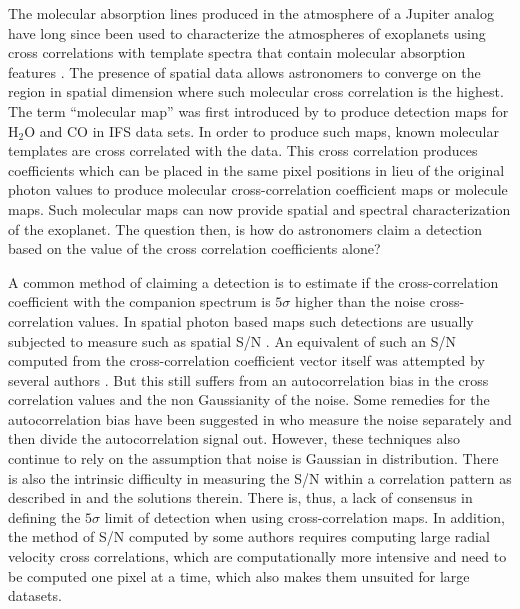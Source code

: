 \documentclass{aa}
\begin{document}
The molecular absorption lines produced in the atmosphere of a Jupiter analog have long since been used to characterize the atmospheres of exoplanets using cross correlations with template spectra \cite[e.g][]{birkby2013detection,snellen2010orbital} that contain molecular absorption features \citep[e.g][]{2003BTsettl}.
The presence of spatial data allows astronomers to converge on the region in spatial dimension where such molecular cross correlation is the highest.
The term ``molecular map'' was first introduced by \citet{2018AHoeijmakersMM} to produce detection maps for \rm{H$_2$O} and \rm{CO} in IFS data sets.
In order to produce such maps, known molecular templates are cross correlated with the data.
This cross correlation produces coefficients which can be placed in the same pixel positions in lieu of the original photon values to produce molecular cross-correlation coefficient maps or molecule maps.
Such molecular maps can now provide spatial and spectral characterization of the exoplanet.
The question then, is how do astronomers claim a detection based on the value of the cross correlation coefficients alone?

A common method of claiming a detection is to estimate if the cross-correlation coefficient with the companion spectrum is $5\sigma$ higher than the noise cross-correlation values.
In spatial photon based maps such detections are usually subjected to measure such as spatial S/N \citep[][]{2014MawetSNR}.
An equivalent of such an S/N computed from the cross-correlation coefficient vector itself was attempted by several authors \citep[e.g., ][]{2018AHoeijmakersMM, 2021Cugno,2022Patapis}.
But this still suffers from an autocorrelation bias in the cross correlation values and the non Gaussianity of the noise.
Some remedies for the autocorrelation bias have been suggested in \citet[][]{ruffio2019radial} who measure the noise separately and then divide the autocorrelation signal out.
However, these techniques also continue to rely on the assumption that noise is Gaussian in distribution.
There is also the intrinsic difficulty in measuring the S/N within a correlation pattern as described in \cite{2023Malin} and the solutions therein. There is, thus, a lack of consensus in defining the $5\sigma$ limit of detection when using cross-correlation maps.
In addition, the method of S/N computed by some authors \citep[e.g in][]{2021Cugno} requires computing large radial velocity cross correlations, which are computationally more intensive and need to be computed one pixel at a time, which also makes them unsuited for large datasets.
\end{document}
